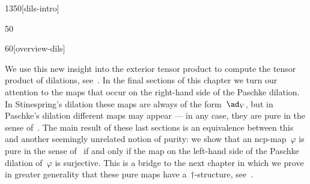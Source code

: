 \begin{parsec}{1350}[dils-intro]
\begin{point}{50}
\begin{point}{60}[overview-dils]
\begin{enumerate}
\end{enumerate}
We use this new insight into the exterior tensor product
    to compute the tensor product
    of dilations, see~.
In the final sections of this chapter we turn our attention to the maps
    that occur on the right-hand side of the Paschke dilation.
In Stinespring's dilation these maps are always of the form~$\ad_V$,
    but in Paschke's dilation different maps may appear ---
    in any case, they are pure in the sense of~.
The main result of these last sections
    is an equivalence between this and another
    seemingly unrelated notion of purity:
    we show that an ncp-map~$\varphi$ is pure in the sense of~
    if and only if the map on the left-hand side of
    the Paschke dilation of~$\varphi$ is surjective.
This is a bridge to the next chapter
    in which we prove in greater generality
    that these pure maps have a~$\dagger$-structure,
    see~.
\end{point}
\end{point}
\end{parsec}

